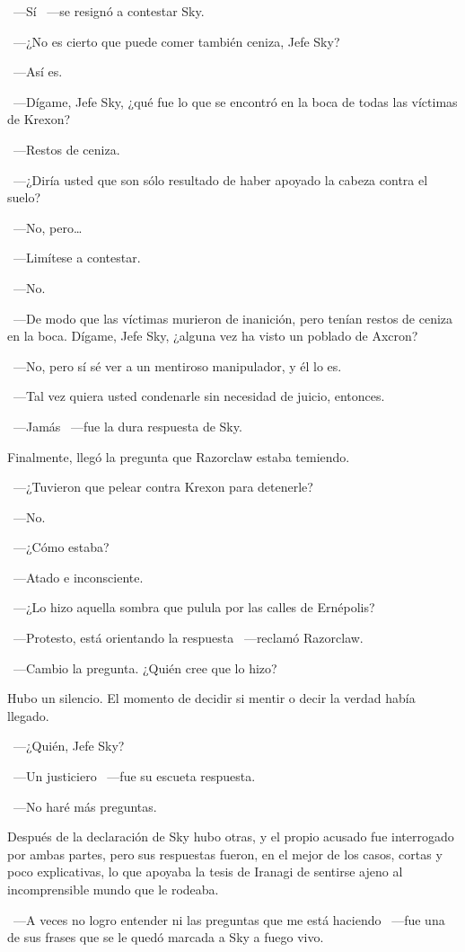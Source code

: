 ~---Sí ~---se resignó a contestar Sky.

~---¿No es cierto que puede comer también ceniza, Jefe Sky?

~---Así es.

~---Dígame, Jefe Sky, ¿qué fue lo que se encontró en la boca de todas las víctimas de Krexon?

~---Restos de ceniza.

~---¿Diría usted que son sólo resultado de haber apoyado la cabeza contra el suelo?

~---No, pero\dots

~---Limítese a contestar.

~---No.

~---De modo que las víctimas murieron de inanición, pero tenían restos de ceniza en la boca. Dígame, Jefe Sky, ¿alguna vez ha visto un poblado de Axcron?

~---No, pero sí sé ver a un mentiroso manipulador, y él lo es.

~---Tal vez quiera usted condenarle sin necesidad de juicio, entonces.

~---Jamás ~---fue la dura respuesta de Sky.

Finalmente, llegó la pregunta que Razorclaw estaba temiendo.

~---¿Tuvieron que pelear contra Krexon para detenerle?

~---No.

~---¿Cómo estaba?

~---Atado e inconsciente.

~---¿Lo hizo aquella sombra que pulula por las calles de Ernépolis?

~---Protesto, está orientando la respuesta ~---reclamó Razorclaw.

~---Cambio la pregunta. ¿Quién cree que lo hizo?

Hubo un silencio. El momento de decidir si mentir o decir la verdad había llegado.

~---¿Quién, Jefe Sky?

~---Un justiciero ~---fue su escueta respuesta.

~---No haré más preguntas.

Después de la declaración de Sky hubo otras, y el propio acusado fue interrogado por ambas partes, pero sus respuestas fueron, en el mejor de los casos, cortas y poco explicativas, lo que apoyaba la tesis de Iranagi de sentirse ajeno al incomprensible mundo que le rodeaba.

~---A veces no logro entender ni las preguntas que me está haciendo ~---fue una de sus frases que se le quedó marcada a Sky a fuego vivo.

